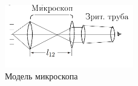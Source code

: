 \documentclass[a4paper, 12pt]{article}%
\begin{document}
	\begin{figure}
			\begin{center}
				\includegraphics[width = 0.5\textwidth]{images/412-4.png}
				\caption{Модель микроскопа}
			\end{center}
		\end{figure}
\end{document}
